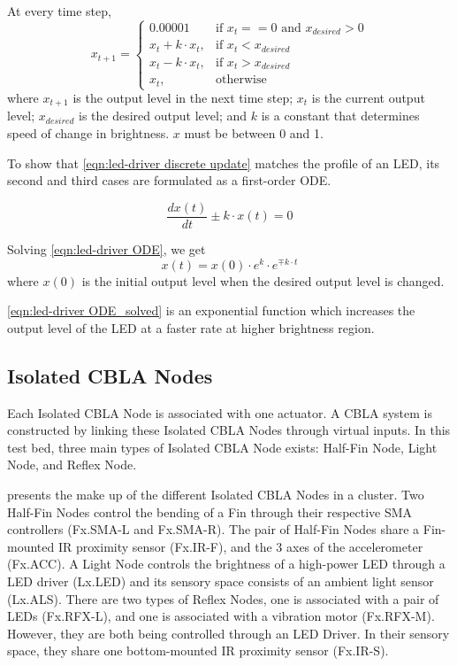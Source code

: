 At every time step, 
\begin{equation}\label{eqn:led-driver discrete update}
	x_{t+1} =
	\begin{cases}
		0.00001 & \text{if } x_{t} == 0 \text{ and }  x_{desired} > 0 \\
		x_{t} + k \cdot x_{t}, & \text{if } x_{t} < x_{desired} \\
		x_{t} - k \cdot x_{t}, & \text{if } x_{t} > x_{desired} \\
		x_{t}, & \text{otherwise}
	\end{cases} 
\end{equation}
where $x_{t+1}$ is the output level in the next time step; $x_t$ is the current output level; $x_{desired}$ is the desired output level; and $k$ is a constant that determines speed of change in brightness. $x$ must be between 0 and 1. 

To show that \eqref{eqn:led-driver discrete update} matches the profile of an LED, its second and third cases are formulated as a first-order ODE. 

\begin{equation}\label{eqn:led-driver ODE}
	 \frac{dx(t)}{dt} \pm k \cdot x(t)  = 0
\end{equation}

Solving \eqref{eqn:led-driver ODE}, we get 
\begin{equation}\label{eqn:led-driver ODE_solved}
	x(t) = x(0) \cdot e^k \cdot e^{\mp k \cdot t}
\end{equation}
where $x(0)$ is the initial output level when the desired output level is changed.

\eqref{eqn:led-driver ODE_solved} is an exponential function which increases the output level of the LED at a faster rate at higher brightness region. 

\subsection{Isolated CBLA Nodes}\label{sec:isolated-cbla-node}

Each Isolated CBLA Node is associated with one actuator. A CBLA system is constructed by linking these Isolated CBLA Nodes through virtual inputs. In this test bed, three main types of Isolated CBLA Node exists: Half-Fin Node, Light Node, and Reflex Node.
 
 presents the make up of the different Isolated CBLA Nodes in a cluster. Two Half-Fin Nodes control the bending of a Fin through their respective SMA controllers (Fx.SMA-L and Fx.SMA-R). The pair of Half-Fin Nodes share a Fin-mounted IR proximity sensor (Fx.IR-F), and the 3 axes of the accelerometer (Fx.ACC). A Light Node controls the brightness of a high-power LED through a LED driver (Lx.LED) and its sensory space consists of an ambient light sensor (Lx.ALS). There are two types of Reflex Nodes, one is associated with a pair of LEDs (Fx.RFX-L), and one is associated with a vibration motor (Fx.RFX-M). However, they are both being controlled through an LED Driver. In their sensory space, they share one bottom-mounted IR proximity sensor (Fx.IR-S). 

